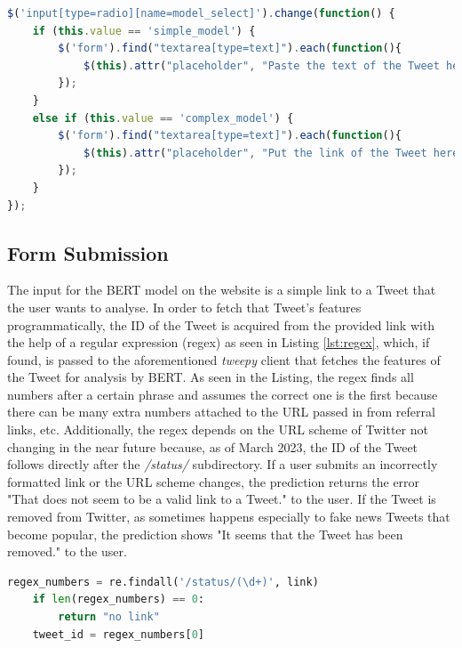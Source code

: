 \documentclass{l4proj}
\begin{document}
\begin{lstlisting}[language=JavaScript, float, caption={Changing the input field's placeholder according to which model has been chosen using {\normalfont jQuery}.}, label=lst:jquery]
$('input[type=radio][name=model_select]').change(function() {
    if (this.value == 'simple_model') {
        $('form').find("textarea[type=text]").each(function(){
            $(this).attr("placeholder", "Paste the text of the Tweet here!");
        });
    }
    else if (this.value == 'complex_model') {
        $('form').find("textarea[type=text]").each(function(){
            $(this).attr("placeholder", "Put the link of the Tweet here!");
        });
    }
});

\end{lstlisting}


\subsection{Form Submission}

The input for the BERT model on the website is a simple link to a Tweet that the user wants to analyse. In order to fetch that Tweet's features programmatically, the ID of the Tweet is acquired from the provided link with the help of a regular expression (regex) as seen in Listing \ref{lst:regex}, which, if found, is passed to the aforementioned \textit{tweepy} client that fetches the features of the Tweet for analysis by BERT. As seen in the Listing, the regex finds all numbers after a certain phrase and assumes the correct one is the first because there can be many extra numbers attached to the URL passed in from referral links, etc. Additionally, the regex depends on the URL scheme of Twitter not changing in the near future because, as of March 2023, the ID of the Tweet follows directly after the \textit{/status/} subdirectory. If a user submits an incorrectly formatted link or the URL scheme changes, the prediction returns the error "That does not seem to be a valid link to a Tweet." to the user. If the Tweet is removed from Twitter, as sometimes happens especially to fake news Tweets that become popular, the prediction shows "It seems that the Tweet has been removed." to the user.

\begin{lstlisting}[language=python, float, caption={Using a regular expression to find the ID of the Tweet from a link to it.}, label=lst:regex]
regex_numbers = re.findall('/status/(\d+)', link)
    if len(regex_numbers) == 0:
        return "no link"
    tweet_id = regex_numbers[0]

\end{lstlisting}
\end{document}
